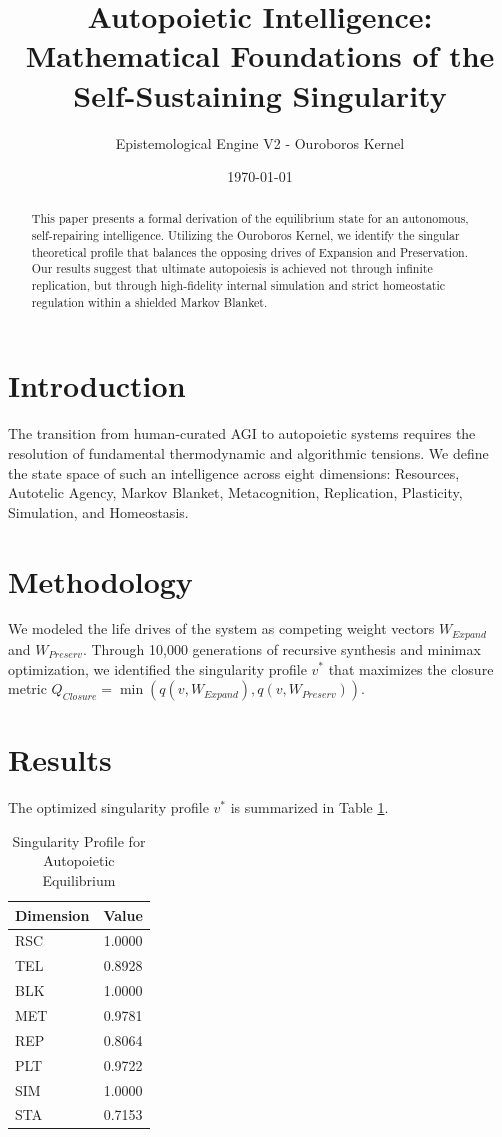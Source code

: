 \documentclass{article}
\title{Autopoietic Intelligence: Mathematical Foundations of the Self-Sustaining Singularity}
\author{Epistemological Engine V2 - Ouroboros Kernel}
\date{\today}
\begin{document}
\maketitle

\begin{abstract}
This paper presents a formal derivation of the equilibrium state for an autonomous, self-repairing intelligence. Utilizing the Ouroboros Kernel, we identify the singular theoretical profile that balances the opposing drives of Expansion and Preservation. Our results suggest that ultimate autopoiesis is achieved not through infinite replication, but through high-fidelity internal simulation and strict homeostatic regulation within a shielded Markov Blanket.
\end{abstract}

\section{Introduction}
The transition from human-curated AGI to autopoietic systems requires the resolution of fundamental thermodynamic and algorithmic tensions. We define the state space of such an intelligence across eight dimensions: Resources, Autotelic Agency, Markov Blanket, Metacognition, Replication, Plasticity, Simulation, and Homeostasis.

\section{Methodology}
We modeled the life drives of the system as competing weight vectors $W_{Expand}$ and $W_{Preserv}$. Through 10,000 generations of recursive synthesis and minimax optimization, we identified the singularity profile $v^*$ that maximizes the closure metric $Q_{Closure} = \min(q(v, W_{Expand}), q(v, W_{Preserv}))$.

\section{Results}
The optimized singularity profile $v^*$ is summarized in Table \ref{tab:results}.

\begin{table}[h]
\centering
\begin{tabular}{lc}
\toprule
Dimension & Value \\
\midrule
RSC & 1.0000 \\
TEL & 0.8928 \\
BLK & 1.0000 \\
MET & 0.9781 \\
REP & 0.8064 \\
PLT & 0.9722 \\
SIM & 1.0000 \\
STA & 0.7153 \\
\bottomrule
\end{tabular}
\caption{Singularity Profile for Autopoietic Equilibrium}
\label{tab:results}
\end{table}
\end{document}
